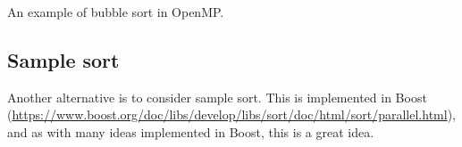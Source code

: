 \begin{codebox}[breakable]{}
\footnotesize An example of bubble sort in OpenMP.
\tcblower
{}
\end{codebox}

\subsection{Sample sort}
 

Another alternative is to consider sample sort. This is implemented in Boost 
(\url{https://www.boost.org/doc/libs/develop/libs/sort/doc/html/sort/parallel.html}), 
and as with many ideas implemented in Boost, this is a great idea. 


